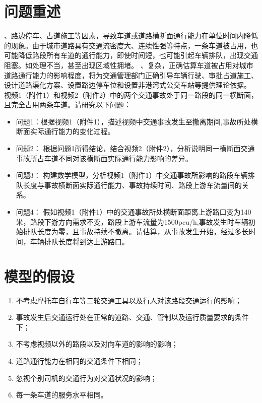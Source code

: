 \documentclass[UTF8,12.05pt]{ctexart}
\begin{document}
\section{\heiti{}问题重述}
、路边停车、占道施工等因素，导致车道或道路横断面通行能力在单位时间内降低的现象。由于城市道路具有交通流密度大、连续性强等特点，一条车道被占用，也可能降低路段所有车道的通行能力，即使时间短，也可能引起车辆排队，出现交通阻塞。如处理不当，甚至出现区域性拥堵。
、复杂，正确估算车道被占用对城市道路通行能力的影响程度，将为交通管理部门正确引导车辆行驶、审批占道施工、设计道路渠化方案、设置路边停车位和设置非港湾式公交车站等提供理论依据。
视频1（附件1）和视频2（附件2）中的两个交通事故处于同一路段的同一横断面，且完全占用两条车道。请研究以下问题：
\begin{itemize}
  \item 问题1：根据视频1（附件1），描述视频中交通事故发生至撤离期间,事故所处横断面实际通行能力的变化过程。
  \item 问题2：  根据问题1所得结论，结合视频2（附件2），分析说明同一横断面交通事故所占车道不同对该横断面实际通行能力影响的差异。
  \item 问题3：  构建数学模型，分析视频1（附件1）中交通事故所影响的路段车辆排队长度与事故横断面实际通行能力、事故持续时间、路段上游车流量间的关系。
  \item 问题4：  假如视频1（附件1）中的交通事故所处横断面距离上游路口变为140米，路段下游方向需求不变，路段上游车流量为1500pcu/h,事故发生时车辆初始排队长度为零，且事故持续不撤离。请估算，从事故发生开始，经过多长时间，车辆排队长度将到达上游路口。
\end{itemize}
\section{\heiti{}模型的假设}
\begin{enumerate}
  \item 不考虑摩托车自行车等二轮交通工具以及行人对该路段交通运行的影响；
  \item 事故发生后交通运行处在正常的道路、交通、管制以及运行质量要求的条件下；
  \item 不考虑视频以外的路段以及对向车道的影响的影响；
  \item 道路通行能力在相同的交通条件下相同；
  \item 忽视个别司机的交通行为对交通状况的影响；
  \item 每一条车道的服务水平相同。
\end{enumerate}
\end{document}
